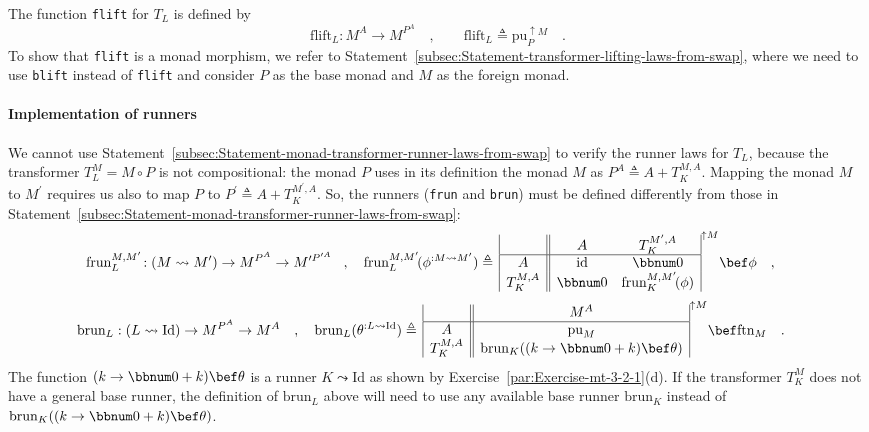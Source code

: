 The function \lstinline!flift! for $T_{L}$ is defined by
\[
\text{flift}_{L}:M^{A}\rightarrow M^{P^{A}}\quad,\quad\quad\text{flift}_{L}\triangleq\text{pu}_{P}^{\uparrow M}\quad.
\]
To show that \lstinline!flift! is a monad morphism, we refer to Statement~\ref{subsec:Statement-transformer-lifting-laws-from-swap},
where we need to use \lstinline!blift! instead of \lstinline!flift!
and consider $P$ as the base monad and $M$ as the foreign monad.

\paragraph{Implementation of runners}

We cannot use Statement~\ref{subsec:Statement-monad-transformer-runner-laws-from-swap}
to verify the runner laws for $T_{L}$, because the transformer $T_{L}^{M}=M\circ P$
is not compositional: the monad $P$ uses in its definition the monad
$M$ as $P^{A}\triangleq A+T_{K}^{M,A}$. Mapping the monad $M$ to
$M^{\prime}$ requires us also to map $P$ to $P^{\prime}\triangleq A+T_{K}^{M^{\prime},A}$.
So, the runners (\lstinline!frun! and \lstinline!brun!) must be
defined differently from those in Statement~\ref{subsec:Statement-monad-transformer-runner-laws-from-swap}:
\begin{align*}
 & \text{frun}_{L}^{M,M^{\prime}}\!:(M\leadsto M^{\prime})\rightarrow M^{P^{A}}\rightarrow M^{\prime P^{\prime A}}\!\quad,\quad\text{frun}_{L}^{M,M^{\prime}}\!(\phi^{:M\leadsto M^{\prime}})\triangleq\,\begin{array}{|c||cc|}
 & A & T_{K}^{M^{\prime},A}\\
\hline A & \text{id} & \bbnum 0\\
T_{K}^{M,A} & \bbnum 0 & \text{frun}_{K}^{M,M^{\prime}}\!(\phi)
\end{array}^{\uparrow M}\bef\phi\quad,
\end{align*}
\begin{align*}
 & \text{brun}_{L}:(L\leadsto\text{Id})\rightarrow M^{P^{A}}\rightarrow M^{A}\quad,\quad\text{brun}_{L}(\theta^{:L\leadsto\text{Id}})\triangleq\,\begin{array}{|c||c|}
 & M^{A}\\
\hline A & \text{pu}_{M}\\
T_{K}^{M,A} & \text{brun}_{K}((k\rightarrow\bbnum 0+k)\bef\theta)
\end{array}^{\uparrow M}\bef\text{ftn}_{M}\quad.
\end{align*}
The function $(k\rightarrow\bbnum 0+k)\bef\theta$ is a runner $K\leadsto\text{Id}$
as shown by Exercise~\ref{par:Exercise-mt-3-2-1}(d). If the transformer
$T_{K}^{M}$ does not have a general base runner, the definition of
$\text{brun}_{L}$ above will need to use any available base runner
$\text{brun}_{K}$ instead of $\text{brun}_{K}((k\rightarrow\bbnum 0+k)\bef\theta)$.

